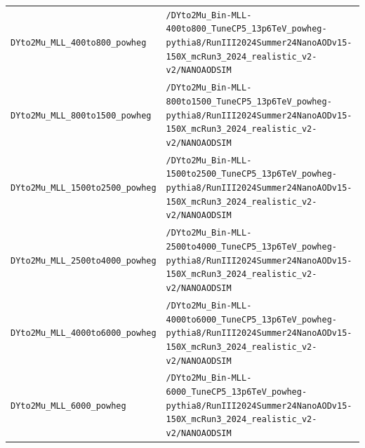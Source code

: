 \begin{longtable}{@{}>{\RaggedRight\arraybackslash}p{} >{\RaggedRight\arraybackslash}p{}@{}}
\addlinespace[2pt]
\texttt{DYto2Mu\_\allowbreak{}MLL\_\allowbreak{}400to800\_\allowbreak{}powheg} & \texttt{/\allowbreak{}DYto2Mu\_\allowbreak{}Bin-\allowbreak{}MLL-\allowbreak{}400to800\_\allowbreak{}TuneCP5\_\allowbreak{}13p6TeV\_\allowbreak{}powheg-\allowbreak{}pythia8/\allowbreak{}RunIII2024Summer24NanoAODv15-\allowbreak{}150X\_\allowbreak{}mcRun3\_\allowbreak{}2024\_\allowbreak{}realistic\_\allowbreak{}v2-\allowbreak{}v2/\allowbreak{}NANOAODSIM} \\
\addlinespace[2pt]
\texttt{DYto2Mu\_\allowbreak{}MLL\_\allowbreak{}800to1500\_\allowbreak{}powheg} & \texttt{/\allowbreak{}DYto2Mu\_\allowbreak{}Bin-\allowbreak{}MLL-\allowbreak{}800to1500\_\allowbreak{}TuneCP5\_\allowbreak{}13p6TeV\_\allowbreak{}powheg-\allowbreak{}pythia8/\allowbreak{}RunIII2024Summer24NanoAODv15-\allowbreak{}150X\_\allowbreak{}mcRun3\_\allowbreak{}2024\_\allowbreak{}realistic\_\allowbreak{}v2-\allowbreak{}v2/\allowbreak{}NANOAODSIM} \\
\addlinespace[2pt]
\texttt{DYto2Mu\_\allowbreak{}MLL\_\allowbreak{}1500to2500\_\allowbreak{}powheg} & \texttt{/\allowbreak{}DYto2Mu\_\allowbreak{}Bin-\allowbreak{}MLL-\allowbreak{}1500to2500\_\allowbreak{}TuneCP5\_\allowbreak{}13p6TeV\_\allowbreak{}powheg-\allowbreak{}pythia8/\allowbreak{}RunIII2024Summer24NanoAODv15-\allowbreak{}150X\_\allowbreak{}mcRun3\_\allowbreak{}2024\_\allowbreak{}realistic\_\allowbreak{}v2-\allowbreak{}v2/\allowbreak{}NANOAODSIM} \\
\addlinespace[2pt]
\texttt{DYto2Mu\_\allowbreak{}MLL\_\allowbreak{}2500to4000\_\allowbreak{}powheg} & \texttt{/\allowbreak{}DYto2Mu\_\allowbreak{}Bin-\allowbreak{}MLL-\allowbreak{}2500to4000\_\allowbreak{}TuneCP5\_\allowbreak{}13p6TeV\_\allowbreak{}powheg-\allowbreak{}pythia8/\allowbreak{}RunIII2024Summer24NanoAODv15-\allowbreak{}150X\_\allowbreak{}mcRun3\_\allowbreak{}2024\_\allowbreak{}realistic\_\allowbreak{}v2-\allowbreak{}v2/\allowbreak{}NANOAODSIM} \\
\addlinespace[2pt]
\texttt{DYto2Mu\_\allowbreak{}MLL\_\allowbreak{}4000to6000\_\allowbreak{}powheg} & \texttt{/\allowbreak{}DYto2Mu\_\allowbreak{}Bin-\allowbreak{}MLL-\allowbreak{}4000to6000\_\allowbreak{}TuneCP5\_\allowbreak{}13p6TeV\_\allowbreak{}powheg-\allowbreak{}pythia8/\allowbreak{}RunIII2024Summer24NanoAODv15-\allowbreak{}150X\_\allowbreak{}mcRun3\_\allowbreak{}2024\_\allowbreak{}realistic\_\allowbreak{}v2-\allowbreak{}v2/\allowbreak{}NANOAODSIM} \\
\addlinespace[2pt]
\texttt{DYto2Mu\_\allowbreak{}MLL\_\allowbreak{}6000\_\allowbreak{}powheg} & \texttt{/\allowbreak{}DYto2Mu\_\allowbreak{}Bin-\allowbreak{}MLL-\allowbreak{}6000\_\allowbreak{}TuneCP5\_\allowbreak{}13p6TeV\_\allowbreak{}powheg-\allowbreak{}pythia8/\allowbreak{}RunIII2024Summer24NanoAODv15-\allowbreak{}150X\_\allowbreak{}mcRun3\_\allowbreak{}2024\_\allowbreak{}realistic\_\allowbreak{}v2-\allowbreak{}v2/\allowbreak{}NANOAODSIM} \\

\end{longtable}
